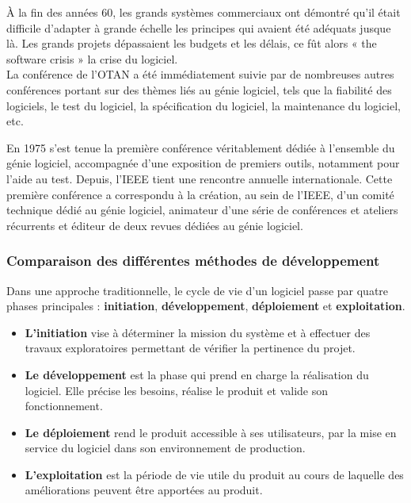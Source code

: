 À la fin des années 60, les grands systèmes commerciaux ont démontré qu'il était difficile d'adapter à grande échelle les principes qui avaient été adéquats jusque là. Les grands projets dépassaient les budgets et les délais, ce fût alors « the software crisis » la crise du logiciel\cite{origine_gl2}.\\

La conférence de l'OTAN a été immédiatement suivie par de nombreuses autres conférences portant sur des thèmes liés au génie logiciel, tels que la fiabilité des logiciels, le test du logiciel, la spécification du logiciel, la maintenance du logiciel, etc.

En 1975 s'est tenue la première conférence véritablement dédiée à l’ensemble du génie logiciel, accompagnée d'une exposition de premiers outils, notamment pour l’aide au test. Depuis, l’IEEE tient une rencontre annuelle internationale. Cette première conférence a correspondu à la création, au sein de l’IEEE, d’un comité technique dédié au génie logiciel, animateur d’une série de conférences et ateliers récurrents et éditeur de deux revues dédiées au génie logiciel\cite{origine_gl3}.
\subsubsection{Comparaison des différentes méthodes de développement}
Dans une approche traditionnelle, le cycle de vie d'un logiciel passe par quatre phases principales : \textbf{initiation}, \textbf{développement}, \textbf{déploiement} et \textbf{exploitation}.
\begin{itemize}
    \item \textbf{L'initiation} vise à déterminer la mission du système et à effectuer des travaux exploratoires permettant de vérifier la pertinence du projet.
    \item \textbf{Le développement} est la phase qui prend en charge la réalisation du logiciel. Elle précise les besoins, réalise le produit et valide son fonctionnement.
    \item \textbf{Le déploiement} rend le produit accessible à ses utilisateurs, par la mise en service du logiciel dans son environnement de production.
    \item \textbf{L’exploitation} est la période de vie utile du produit au cours de laquelle des améliorations peuvent être apportées au produit.
\end{itemize}


